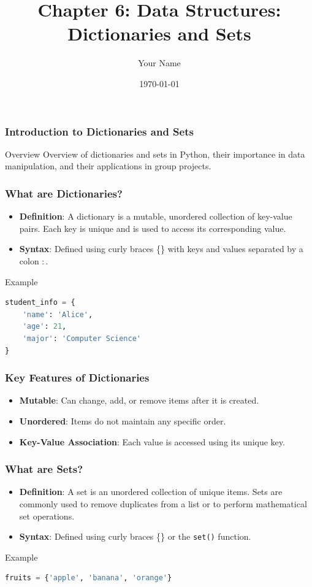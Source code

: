 \documentclass{beamer}
\title{Chapter 6: Data Structures: Dictionaries and Sets}
\author{Your Name}
\institute{Your Institution}
\date{\today}
\begin{document}
\frame{\titlepage}

\begin{frame}[fragile]
    \frametitle{Introduction to Dictionaries and Sets}
    \begin{block}{Overview}
        Overview of dictionaries and sets in Python, their importance in data manipulation, and their applications in group projects.
    \end{block}
\end{frame}

\begin{frame}[fragile]
    \frametitle{What are Dictionaries?}
    \begin{itemize}
        \item \textbf{Definition}: A dictionary is a mutable, unordered collection of key-value pairs. Each key is unique and is used to access its corresponding value.
        \item \textbf{Syntax}: Defined using curly braces \{\} with keys and values separated by a colon \(:\).
    \end{itemize}
    \begin{block}{Example}
        \begin{lstlisting}[language=Python]
student_info = {
    'name': 'Alice',
    'age': 21,
    'major': 'Computer Science'
}
        \end{lstlisting}
    \end{block}
\end{frame}

\begin{frame}[fragile]
    \frametitle{Key Features of Dictionaries}
    \begin{itemize}
        \item \textbf{Mutable}: Can change, add, or remove items after it is created.
        \item \textbf{Unordered}: Items do not maintain any specific order.
        \item \textbf{Key-Value Association}: Each value is accessed using its unique key.
    \end{itemize}
\end{frame}

\begin{frame}[fragile]
    \frametitle{What are Sets?}
    \begin{itemize}
        \item \textbf{Definition}: A set is an unordered collection of unique items. Sets are commonly used to remove duplicates from a list or to perform mathematical set operations.
        \item \textbf{Syntax}: Defined using curly braces \{\} or the \texttt{set()} function.
    \end{itemize}
    \begin{block}{Example}
        \begin{lstlisting}[language=Python]
fruits = {'apple', 'banana', 'orange'}
        \end{lstlisting}
    \end{block}
\end{frame}
\end{document}
